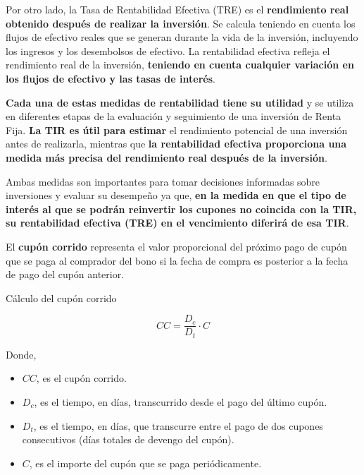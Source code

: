 \documentclass[
  letterpaper,
  DIV=11,
  numbers=noendperiod]{scrreprt}
\begin{document}
\begin{tcolorbox}
Por otro lado, la Tasa de Rentabilidad Efectiva (TRE) es el
\textbf{rendimiento real obtenido después de realizar la inversión}. Se
calcula teniendo en cuenta los flujos de efectivo reales que se generan
durante la vida de la inversión, incluyendo los ingresos y los
desembolsos de efectivo. La rentabilidad efectiva refleja el rendimiento
real de la inversión, \textbf{teniendo en cuenta cualquier variación en
los flujos de efectivo y las tasas de interés}.

\textbf{Cada una de estas medidas de rentabilidad tiene su utilidad} y
se utiliza en diferentes etapas de la evaluación y seguimiento de una
inversión de Renta Fija. \textbf{La TIR es útil para estimar} el
rendimiento potencial de una inversión antes de realizarla, mientras que
\textbf{la rentabilidad efectiva proporciona una medida más precisa del
rendimiento real después de la inversión}.

Ambas medidas son importantes para tomar decisiones informadas sobre
inversiones y evaluar su desempeño ya que, \textbf{en la medida en que
el tipo de interés al que se podrán reinvertir los cupones no coincida
con la TIR, su rentabilidad efectiva (TRE) en el vencimiento diferirá de
esa TIR}.

El \textbf{cupón corrido} representa el valor proporcional del próximo
pago de cupón que se paga al comprador del bono si la fecha de compra es
posterior a la fecha de pago del cupón anterior.

\begin{tcolorbox}[enhanced jigsaw, toprule=.15mm, left=2mm, arc=.35mm, breakable, bottomrule=.15mm, opacityback=0, rightrule=.15mm, leftrule=.75mm, colframe=quarto-callout-note-color-frame, colback=white]
\begin{minipage}[t]{5.5mm}
\textcolor{quarto-callout-note-color}{\faInfo}
\end{minipage}%
\begin{minipage}[t]{\textwidth - 5.5mm}

Cálculo del cupón corrido

\[CC=\frac{D_c}{D_t}\cdot C\]

Donde,

\begin{itemize}
\item
  \(CC\), es el cupón corrido.
\item
  \(D_{c}\), es el tiempo, en días, transcurrido desde el pago del
  último cupón.
\item
  \(D_{t}\), es el tiempo, en días, que transcurre entre el pago de dos
  cupones consecutivos (días totales de devengo del cupón).
\item
  \(C\), es el importe del cupón que se paga periódicamente.
\end{itemize}


\end{minipage}
\end{tcolorbox}
\end{tcolorbox}
\end{document}
